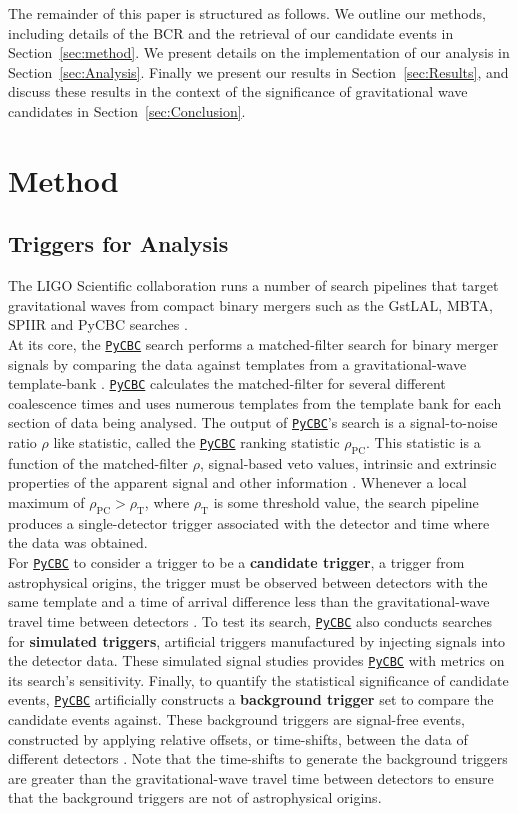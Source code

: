 \documentclass[%
preprint,
 amsmath,amssymb,
 aps,
]{revtex4}
\newcommand{\pycbc}{{\sc \href{https://pycbc.org/}{\texttt{PyCBC}}}\xspace}
\newcommand{\bcr}{{\sc BCR}\xspace}
\begin{document}
The remainder of this paper is structured as follows. We outline our methods, including details of the \bcr and the retrieval of our candidate events in Section~\ref{sec:method}. We present details on the implementation of our analysis in Section~\ref{sec:Analysis}. Finally we present our results in Section~\ref{sec:Results}, and discuss these results in the context of the significance of gravitational wave candidates in Section~\ref{sec:Conclusion}.


\section{Method\label{sec:method}}

\subsection{Triggers for Analysis}
The LIGO Scientific collaboration runs a number of search pipelines that target gravitational waves from compact binary mergers such as the GstLAL, MBTA, SPIIR and PyCBC searches \cite{abbott2019gwtc}.\\

At its core, the \pycbc \cite{pycbc_code} search performs a matched-filter search for binary merger signals by comparing the data against templates from a gravitational-wave template-bank \cite{pycbc_og6}. \pycbc calculates the matched-filter for several different coalescence times and uses numerous templates from the template bank for each section of data being analysed. The output of \pycbc's search is a signal-to-noise ratio $\rho$ like statistic, called the \pycbc ranking statistic $\rho_\text{PC}$. This statistic is a function of the matched-filter $\rho$, signal-based veto values, intrinsic and extrinsic properties of the apparent signal and other information \cite{pycbc_og6}. Whenever a local maximum of $\rho_\text{PC} > \rho_\text{T}$, where $\rho_\text{T}$ is some threshold value, the search pipeline produces a single-detector trigger associated with the detector and time where the data was obtained.\\

For \pycbc to consider a trigger to be a \textbf{candidate trigger}, a trigger from astrophysical origins, the trigger must be observed between detectors with the same template and a time of arrival difference less than the gravitational-wave travel time between detectors \cite{pycbc_og6}. To test its search, \pycbc also conducts searches for \textbf{simulated triggers}, artificial triggers manufactured by injecting signals into the detector data. These simulated signal studies provides \pycbc with metrics on its search's sensitivity. Finally, to quantify the statistical significance of candidate events, \pycbc artificially constructs a \textbf{background trigger} set to compare the candidate events against. These background triggers are signal-free events, constructed by applying relative offsets, or time-shifts, between the data of different detectors \cite{pycbc_og6}. Note that the time-shifts to generate the background triggers are greater than the gravitational-wave travel time between detectors to ensure that the background triggers are not of astrophysical origins. \\
\end{document}
